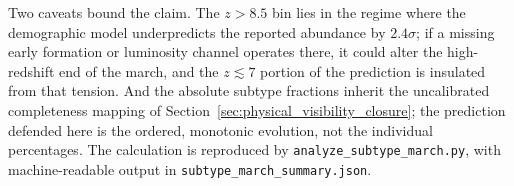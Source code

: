 Two caveats bound the claim. The $z>8.5$ bin lies in the regime where the
demographic model underpredicts the reported abundance by $2.4\sigma$; if a
missing early formation or luminosity channel operates there, it could alter
the high-redshift end of the march, and the $z\lesssim7$ portion of the
prediction is insulated from that tension. And the absolute subtype fractions
inherit the uncalibrated completeness mapping of
Section~\ref{sec:physical_visibility_closure}; the prediction defended here is
the ordered, monotonic evolution, not the individual percentages. The
calculation is reproduced by \texttt{analyze\_subtype\_march.py}, with
machine-readable output in \texttt{subtype\_march\_summary.json}.
